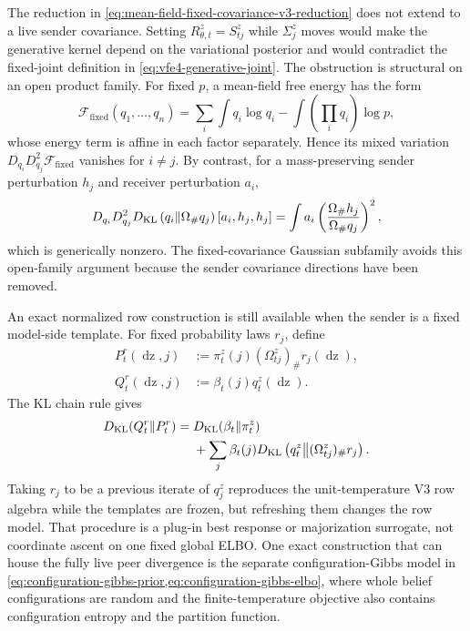The reduction in \cref{eq:mean-field-fixed-covariance-v3-reduction} does not extend to a live sender covariance. Setting $R_{\theta,t}^z=S_{tj}^z$ while $\Sigma_j^z$ moves would make the generative kernel depend on the variational posterior and would contradict the fixed-joint definition in \cref{eq:vfe4-generative-joint}. The obstruction is structural on an open product family. For fixed $p$, a mean-field free energy has the form
\begin{equation}
\mathcal F_{\mathrm{fixed}}(q_1,\ldots,q_n)
=\sum_i\int q_i\log q_i
-\int\left(\prod_iq_i\right)\log p,
\label{eq:fixed-joint-open-family-free-energy}
\end{equation}
whose energy term is affine in each factor separately. Hence its mixed variation $D_{q_i}D_{q_j}^2\mathcal F_{\mathrm{fixed}}$ vanishes for $i\ne j$. By contrast, for a mass-preserving sender perturbation $h_j$ and receiver perturbation $a_i$,
\begin{equation}
D_{q_i}D_{q_j}^2
D_{\mathrm{KL}}\left(q_i\middle\Vert\Omega_\#q_j\right)
[a_i,h_j,h_j]
=\int a_i
\left(
\frac{\Omega_\#h_j}{\Omega_\#q_j}
\right)^2,
\label{eq:moving-peer-mixed-variation}
\end{equation}
which is generically nonzero. The fixed-covariance Gaussian subfamily avoids this open-family argument because the sender covariance directions have been removed.

An exact normalized row construction is still available when the sender is a fixed model-side template. For fixed probability laws $r_j$, define
\begin{equation}
\begin{aligned}
P_t^r(\mathop{\mathrm dz},j)
&:=\pi_t^z(j)(\Omega_{tj}^z)_\#r_j(\mathop{\mathrm dz}),\\
Q_t^r(\mathop{\mathrm dz},j)
&:=\beta_t(j)q_t^z(\mathop{\mathrm dz}).
\end{aligned}
\label{eq:fixed-template-row-laws}
\end{equation}
The KL chain rule gives
\begin{equation}
\begin{aligned}
D_{\mathrm{KL}}(Q_t^r\Vert P_t^r)
={}&D_{\mathrm{KL}}(\beta_t\Vert\pi_t^z)\\
&+\sum_j\beta_t(j)
D_{\mathrm{KL}}\left(q_t^z\middle\Vert(\Omega_{tj}^z)_\#r_j\right).
\end{aligned}
\label{eq:fixed-template-row-kl-decomposition}
\end{equation}
Taking $r_j$ to be a previous iterate of $q_j^z$ reproduces the unit-temperature V3 row algebra while the templates are frozen, but refreshing them changes the row model. That procedure is a plug-in best response or majorization surrogate, not coordinate ascent on one fixed global ELBO. One exact construction that can house the fully live peer divergence is the separate configuration-Gibbs model in \cref{eq:configuration-gibbs-prior,eq:configuration-gibbs-elbo}, where whole belief configurations are random and the finite-temperature objective also contains configuration entropy and the partition function.

